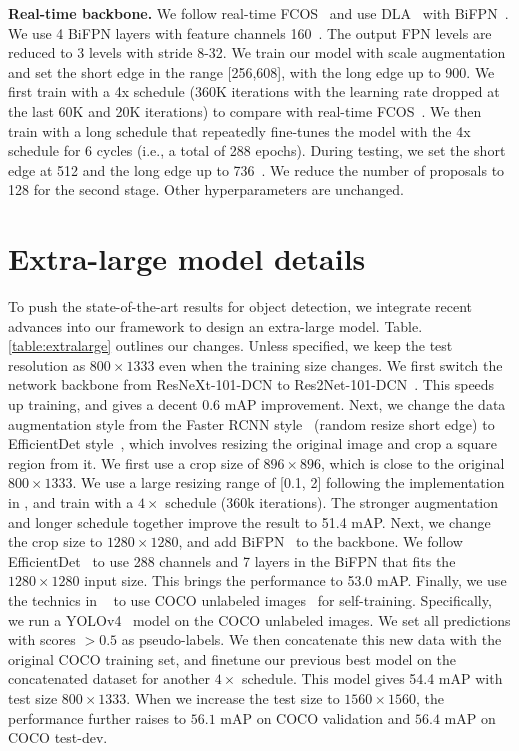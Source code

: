 \documentclass{article}
\begin{document}
\noindent \textbf{Real-time backbone.}
We follow real-time FCOS~\cite{tian2020fcos} and use DLA~\cite{yu2018deep} with BiFPN~\cite{tan2020efficientdet}.
We use 4 BiFPN layers with feature channels 160~\cite{tian2020fcos}.
The output FPN levels are reduced to 3 levels with stride 8-32.
We train our model with scale augmentation and set the short edge in the range [256,608], with the long edge up to 900.
We first train with a 4x schedule (360K iterations with the learning rate dropped at the last 60K and 20K iterations) to compare with real-time FCOS~\cite{tian2020fcos}.
We then train with a long schedule that repeatedly fine-tunes the model with the 4x schedule for 6 cycles (i.e., a total of 288 epochs).
During testing, we set the short edge at 512 and the long edge up to 736~\cite{tian2020fcos}.
We reduce the number of proposals to 128 for the second stage.
Other hyperparameters are unchanged.




\section{Extra-large model details}
To push the state-of-the-art results for object detection, we integrate recent advances into our framework to design an extra-large model.
Table.\ref{table:extralarge} outlines our changes.
Unless specified, we keep the test resolution as $800\times1333$ even when the training size changes.
We first switch the network backbone from ResNeXt-101-DCN to Res2Net-101-DCN~\cite{gao2019res2net}. This speeds up training, and gives a decent $0.6$ mAP improvement.
Next, we change the data augmentation style from the Faster RCNN style~\cite{wu2019detectron2,mmdetection} (random resize short edge) to EfficientDet style~\cite{tan2020efficientdet}, which involves resizing the original image and crop a square region from it. 
We first use a crop size of $896\times896$, which is close to the original $800\times1333$. 
We use a large resizing range of [0.1, 2] following the implementation in \citet{wightman2020}, and train with a $4\times$ schedule (360k iterations).
The stronger augmentation and longer schedule together improve the result to 51.4 mAP.
Next, we change the crop size to $1280\times1280$, and add BiFPN~\cite{tan2020efficientdet} to the backbone. We follow EfficientDet~\cite{tan2020efficientdet} to use 288 channels and 7 layers in the BiFPN that fits the $1280\times1280$ input size.
This brings the performance to 53.0 mAP.
Finally, we use the technics in ~\citet{zoph2020rethinking} to use COCO unlabeled images~\cite{lin2014coco} for self-training.
Specifically, we run a YOLOv4~\cite{wang2020scaled} model on the COCO unlabeled images. 
We set all predictions with scores $>0.5$ as pseudo-labels.
We then concatenate this new data with the original COCO training set, and finetune our previous best model on the concatenated dataset for another $4\times$ schedule.
This model gives 54.4 mAP with test size $800\times1333$.
When we increase the test size to $1560\times1560$, the performance further raises to $56.1$ mAP on COCO validation and $56.4$ mAP on COCO test-dev.
\end{document}
